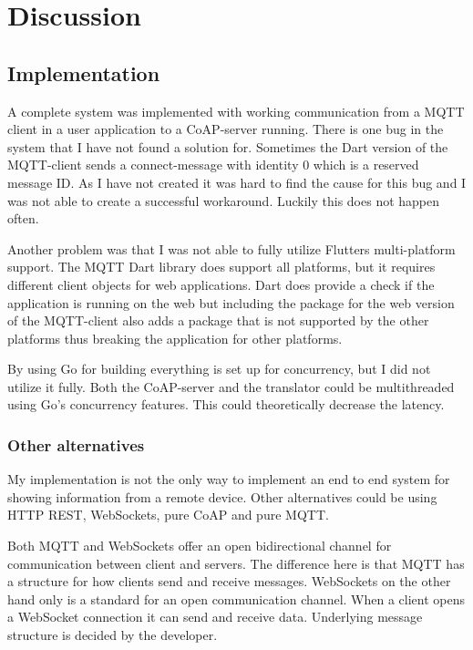 \section{Discussion}
\label{ch:concl}
\noindent	
\subsection{Implementation}
\label{ch:concl:imp}
A complete system was implemented with working communication from a MQTT client in a user application to a CoAP-server running. There is one bug in the system that I have not found a solution for. Sometimes the Dart version of the MQTT-client sends a connect-message with identity 0 which is a reserved message ID. As I have not created it was hard to find the cause for this bug and I was not able to create a successful workaround. Luckily this does not happen often.

Another problem was that I was not able to fully utilize Flutters multi-platform support. The MQTT Dart library does support all platforms, but it requires different client objects for web applications. Dart does provide a check if the application is running on the web but including the package for the web version of the MQTT-client also adds a package that is not supported by the other platforms thus breaking the application for other platforms. 

By using Go for building everything is set up for concurrency, but I did not utilize it fully. Both the CoAP-server and the translator could be multithreaded using Go's concurrency features. This could theoretically decrease the latency.

\subsubsection{Other alternatives}
My implementation is not the only way to implement an end to end system for showing information from a remote device. Other alternatives could be using HTTP REST, WebSockets, pure CoAP and pure MQTT. 

Both MQTT and WebSockets offer an open bidirectional channel for communication between client and servers. The difference here is that MQTT has a structure for how clients send and receive messages. WebSockets on the other hand only is a standard for an open communication channel. When a client opens a WebSocket connection it can send and receive data. Underlying message structure is decided by the developer\cite{rfc6455}.

